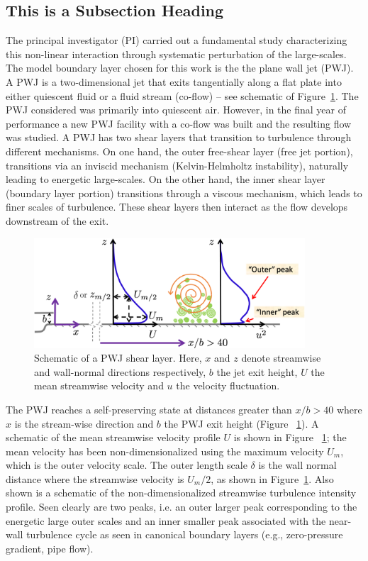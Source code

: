 \subsection{This is a Subsection Heading}
The principal investigator (PI) carried out a fundamental study characterizing this non-linear interaction through systematic perturbation of the large-scales. The model boundary layer chosen for this work is the the plane wall jet (PWJ). A PWJ is a two-dimensional jet that exits tangentially along a flat plate into either quiescent fluid or a fluid stream (co-flow) \citep{Launder1981a,Launder1983a} -- see schematic of Figure~\ref{fg:pwj_sch}. The PWJ considered was primarily into quiescent air. However, in the final year of performance a new PWJ facility with a co-flow was built and the resulting flow was studied. A PWJ has two shear layers that transition to turbulence through different mechanisms. On one hand, the outer free-shear layer (free jet portion),  transitions via an inviscid mechanism (Kelvin-Helmholtz instability), naturally leading to energetic large-scales. On the other hand, the inner shear layer (boundary layer portion) transitions through a viscous mechanism, which leads to finer scales of turbulence. These shear layers then interact as the flow develops downstream of the exit.

\begin{figure}[ht]
	\centering 
	\includegraphics[clip = true,width=0.9\textwidth]{pics/wallJetBl.png}%
	\caption{Schematic of a PWJ shear layer. Here, $x$ and $z$ denote streamwise and wall-normal directions respectively, $b$ the jet exit height, ${U}$ the mean streamwise velocity and $u$ the velocity fluctuation.}
	\label{fg:pwj_sch}
\end{figure}

The PWJ reaches a self-preserving state at distances greater than $x/b>40$ where $x$ is the stream-wise direction and $b$ the PWJ exit height (Figure ~\ref{fg:pwj_sch}). A schematic of the mean streamwise velocity profile $U$  is shown in Figure ~\ref{fg:pwj_sch}; the mean velocity has been non-dimensionalized using the maximum velocity $U_m$, which is the outer velocity scale. The outer length scale $\delta$ is the wall normal distance where the streamwise velocity is $U_m/2$, as shown in Figure~\ref{fg:pwj_sch}. Also shown is a schematic of the non-dimensionalized streamwise turbulence intensity profile. Seen clearly are two peaks, i.e. an outer larger peak corresponding to the energetic large outer scales and an inner smaller peak associated with the near-wall turbulence cycle as seen in canonical boundary layers (e.g., zero-pressure gradient, pipe flow). 
